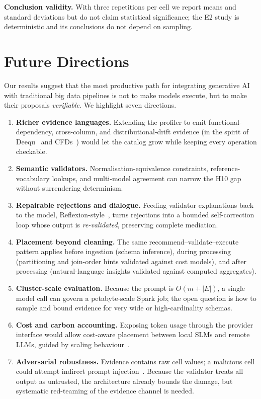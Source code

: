 \noindent\textbf{Conclusion validity.} With three repetitions per cell we report means and standard deviations but do not claim statistical significance; the E2 study is deterministic and its conclusions do not depend on sampling.

\section{Future Directions}
\label{sec:future}
Our results suggest that the most productive path for integrating generative AI with traditional big data pipelines is not to make models execute, but to make their proposals \emph{verifiable}. We highlight seven directions.

\begin{enumerate}[leftmargin=*,nosep]
  \item \textbf{Richer evidence languages.} Extending the profiler to emit functional-dependency, cross-column, and distributional-drift evidence (in the spirit of Deequ~\cite{schelter2018deequ} and CFDs~\cite{fan2008cfd}) would let the catalog grow while keeping every operation checkable.
  \item \textbf{Semantic validators.} Normalisation-equivalence constraints, reference-vocabulary lookups, and multi-model agreement can narrow the H10 gap without surrendering determinism.
  \item \textbf{Repairable rejections and dialogue.} Feeding validator explanations back to the model, Reflexion-style~\cite{shinn2023reflexion}, turns rejections into a bounded self-correction loop whose output is \emph{re-validated}, preserving complete mediation.
  \item \textbf{Placement beyond cleaning.} The same recommend--validate--execute pattern applies before ingestion (schema inference), during processing (partitioning and join-order hints validated against cost models), and after processing (natural-language insights validated against computed aggregates).
  \item \textbf{Cluster-scale evaluation.} Because the prompt is $O(m+|E|)$, a single model call can govern a petabyte-scale Spark job; the open question is how to sample and bound evidence for very wide or high-cardinality schemas.
  \item \textbf{Cost and carbon accounting.} Exposing token usage through the provider interface would allow cost-aware placement between local SLMs and remote LLMs, guided by scaling behaviour~\cite{kaplan2020scaling}.
  \item \textbf{Adversarial robustness.} Evidence contains raw cell values; a malicious cell could attempt indirect prompt injection~\cite{greshake2023injection}. Because the validator treats all output as untrusted, the architecture already bounds the damage, but systematic red-teaming of the evidence channel is needed.
\end{enumerate}

